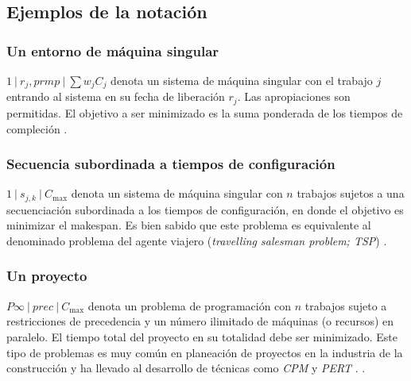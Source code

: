 \documentclass[spanish,draft,12pt,headsepline,footsepline,paper=letter]{scrreprt}
\newenvironment{simple}{\setlength{\parindent}{0pt}}{}
\begin{document}
\subsection{Ejemplos de la notación}
\label{sub:notacion_ejemplos}

\subsubsection{Un entorno de máquina singular}

\begin{simple}
  $1 \: \lvert \: r_j, prmp \: \lvert \: \sum w_jC_j$ denota un sistema de máquina singular con el trabajo $j$ entrando al sistema en su fecha de liberación $r_j$. Las apropiaciones son permitidas. El objetivo a ser minimizado es la suma ponderada de los tiempos de compleción \citep[p.~20]{Pinedo1995}.
\end{simple}

\subsubsection{Secuencia subordinada a tiempos de configuración}

\begin{simple}
  $1 \: \lvert \: s_{j,k} \: \lvert \: C_{\max}$ denota un sistema de máquina singular con $n$ trabajos sujetos a una secuenciación subordinada a los tiempos de configuración, en donde el objetivo es minimizar el makespan. Es bien sabido que este problema es equivalente al denominado problema del agente viajero (\textit{travelling salesman problem; TSP}) \citep[p.~20]{Pinedo1995}.
\end{simple}

\subsubsection{Un proyecto}

\begin{simple}
  $P \infty \: \lvert \: prec \: \lvert \: C_{\max}$ denota un problema de programación con $n$ trabajos sujeto a restricciones de precedencia y un número ilimitado de máquinas (o recursos) en paralelo. El tiempo total del proyecto en su totalidad debe ser minimizado. Este tipo de problemas es muy común en planeación de proyectos en la industria de la construcción y ha llevado al desarrollo de técnicas como \textit{CPM} y \textit{PERT} \citep[p.~21]{Pinedo1995}.
\end{simple}.
\end{document}
